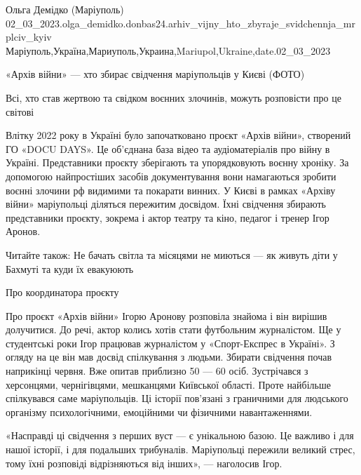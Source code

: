  
 
 
 
 

Ольга Демідко (Маріуполь)
02_03_2023.olga_demidko.donbas24.arhiv_vijny_hto_zbyraje_svidchennja_mrplciv_kyiv
Маріуполь,Україна,Мариуполь,Украина,Mariupol,Ukraine,date.02_03_2023

«Архів війни» — хто збирає свідчення маріупольців у Києві (ФОТО)

Всі, хто став жертвою та свідком воєнних злочинів, можуть розповісти про це
світові

Влітку 2022 року в Україні було започатковано проєкт «Архів війни», створений
ГО «DOCU DAYS». Це об'єднана база відео та аудіоматеріалів про війну в Україні.
Представники проєкту зберігають та упорядковують воєнну хроніку. За допомогою
найпростіших засобів документування вони намагаються зробити воєнні злочини рф
видимими та покарати винних. У Києві в рамках «Архіву війни» маріупольці
діляться пережитим досвідом. Їхні свідчення збирають представники проєкту,
зокрема і актор театру та кіно, педагог і тренер Ігор Аронов.

Читайте також: Не бачать світла та місяцями не миються — як живуть діти у
Бахмуті та куди їх евакуюють

Про координатора проєкту

Про проєкт «Архів війни» Ігорю Аронову розповіла знайома і він вирішив
долучитися. До речі, актор колись хотів стати футбольним журналістом. Ще у
студентські роки Ігор працював журналістом у «Спорт-Експрес в Україні». З
огляду на це він мав досвід спілкування з людьми. Збирати свідчення почав
наприкінці червня. Вже опитав приблизно 50 — 60 осіб. Зустрічався з херсонцями,
чернігівцями, мешканцями Київської області. Проте найбільше спілкувався саме
маріупольців. Ці історії пов'язані з граничними для людського організму
психологічними, емоційними чи фізичними навантаженнями.

«Насправді ці свідчення з перших вуст — є унікальною базою. Це важливо і для
нашої історії, і для подальших трибуналів. Маріупольці пережили великий стрес,
тому їхні розповіді відрізняються від інших», — наголосив Ігор.

